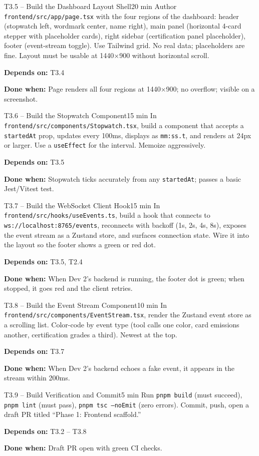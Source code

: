 \documentclass[11pt,letterpaper]{article}
\newcommand{\acceptance}[1]{\par\smallskip\textcolor{ibmgreen}{\textbf{Done when:}} #1}
\newcommand{\depends}[1]{\par\smallskip\textcolor{ibmorange}{\textbf{Depends on:}} #1}
\begin{document}
\begin{task}{T3.5 -- Build the Dashboard Layout Shell}{20 min}
Author \texttt{frontend/src/app/page.tsx} with the four regions of the dashboard: header (stopwatch left, wordmark center, name right), main panel (horizontal 4-card stepper with placeholder cards), right sidebar (certification panel placeholder), footer (event-stream toggle). Use Tailwind grid. No real data; placeholders are fine. Layout must be usable at 1440$\times$900 without horizontal scroll.
\depends{T3.4}
\acceptance{Page renders all four regions at 1440$\times$900; no overflow; visible on a screenshot.}
\end{task}

\begin{task}{T3.6 -- Build the Stopwatch Component}{15 min}
In \texttt{frontend/src/components/Stopwatch.tsx}, build a component that accepts a \texttt{startedAt} prop, updates every 100ms, displays as \texttt{mm:ss.t}, and renders at 24px or larger. Use a \texttt{useEffect} for the interval. Memoize aggressively.
\depends{T3.5}
\acceptance{Stopwatch ticks accurately from any \texttt{startedAt}; passes a basic Jest/Vitest test.}
\end{task}

\begin{task}{T3.7 -- Build the WebSocket Client Hook}{15 min}
In \texttt{frontend/src/hooks/useEvents.ts}, build a hook that connects to \texttt{ws://localhost:8765/events}, reconnects with backoff (1s, 2s, 4s, 8s), exposes the event stream as a Zustand store, and surfaces connection state. Wire it into the layout so the footer shows a green or red dot.
\depends{T3.5, T2.4}
\acceptance{When Dev 2's backend is running, the footer dot is green; when stopped, it goes red and the client retries.}
\end{task}

\begin{task}{T3.8 -- Build the Event Stream Component}{10 min}
In \texttt{frontend/src/components/EventStream.tsx}, render the Zustand event store as a scrolling list. Color-code by event type (tool calls one color, card emissions another, certification grades a third). Newest at the top.
\depends{T3.7}
\acceptance{When Dev 2's backend echoes a fake event, it appears in the stream within 200ms.}
\end{task}

\begin{task}{T3.9 -- Build Verification and Commit}{5 min}
Run \texttt{pnpm build} (must succeed), \texttt{pnpm lint} (must pass), \texttt{pnpm tsc --noEmit} (zero errors). Commit, push, open a draft PR titled ``Phase 1: Frontend scaffold.''
\depends{T3.2 -- T3.8}
\acceptance{Draft PR open with green CI checks.}
\end{task}
\end{document}
